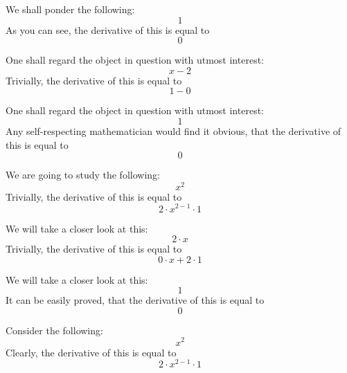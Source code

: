 \documentclass{article}
\begin{document}
We shall ponder the following:
\begin{equation}
1 
\end{equation}
As you can see, the derivative of this is equal to
\begin{equation}
0 
\end{equation}

One shall regard the object in question with utmost interest:
\begin{equation}
x - 2 
\end{equation}
Trivially, the derivative of this is equal to
\begin{equation}
1 - 0 
\end{equation}

One shall regard the object in question with utmost interest:
\begin{equation}
1 
\end{equation}
Any self-respecting mathematician would find it obvious, that the derivative of this is equal to
\begin{equation}
0 
\end{equation}

We are going to study the following:
\begin{equation}
x ^{2 } 
\end{equation}
Trivially, the derivative of this is equal to
\begin{equation}
2 \cdot x ^{2 - 1 } \cdot 1 
\end{equation}

We will take a closer look at this:
\begin{equation}
2 \cdot x 
\end{equation}
Trivially, the derivative of this is equal to
\begin{equation}
0 \cdot x + 2 \cdot 1 
\end{equation}

We will take a closer look at this:
\begin{equation}
1 
\end{equation}
It can be easily proved, that the derivative of this is equal to
\begin{equation}
0 
\end{equation}

Consider the following:
\begin{equation}
x ^{2 } 
\end{equation}
Clearly, the derivative of this is equal to
\begin{equation}
2 \cdot x ^{2 - 1 } \cdot 1 
\end{equation}
\end{document}
